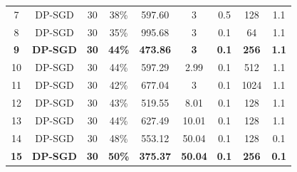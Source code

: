 \begin{table}[!ht]
{\begin{tabular}{|c|c|c|c|c|c|c|c|c|}
            7                      & DP-SGD             & 30              & 38\%              & 597.60                     & 3                     & 0.5                    & 128                 & 1.1                       \\
            8                      & DP-SGD             & 30              & 35\%              & 995.68                     & 3                     & 0.1                    & 64                  & 1.1                       \\
            \textbf{9}             & \textbf{DP-SGD}    & \textbf{30}     & \textbf{44\%}     & \textbf{473.86}            & \textbf{3}            & \textbf{0.1}           & \textbf{256}        & \textbf{1.1}              \\
            10                     & DP-SGD             & 30              & 44\%              & 597.29                     & 2.99                  & 0.1                    & 512                 & 1.1                       \\
            11                     & DP-SGD             & 30              & 42\%              & 677.04                     & 3                     & 0.1                    & 1024                & 1.1                       \\
            12                     & DP-SGD             & 30              & 43\%              & 519.55                     & 8.01                  & 0.1                    & 128                 & 1.1                       \\
            13                     & DP-SGD             & 30              & 44\%              & 627.49                     & 10.01                 & 0.1                    & 128                 & 1.1                       \\
            14                     & DP-SGD             & 30              & 48\%              & 553.12                     & 50.04                 & 0.1                    & 128                 & 0.1                       \\
            \textbf{15}            & \textbf{DP-SGD}    & \textbf{30}     & \textbf{50\%}     & \textbf{375.37}            & \textbf{50.04}        & \textbf{0.1}           & \textbf{256}        & \textbf{0.1}              \\

            \hline
        \end{tabular}
    } %
    \label{tab:exp_results2}  %
\end{table}


